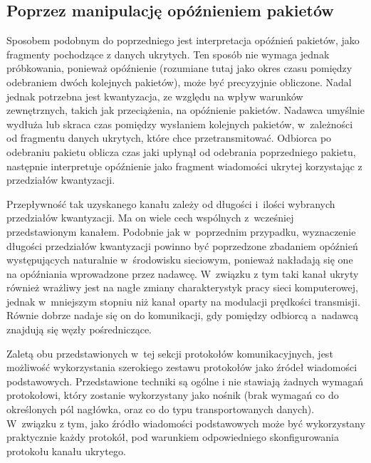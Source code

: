 \documentclass[a4paper, twoside, 12pt]{report}
\begin{document}
        \subsection{Poprzez manipulację opóźnieniem pakietów}
        Sposobem podobnym do poprzedniego jest interpretacja opóźnień pakietów,
        jako fragmenty pochodzące z danych ukrytych\cite{IPDELAYCHANNEL}. Ten sposób nie wymaga jednak próbkowania,
        ponieważ opóźnienie (rozumiane tutaj jako okres czasu pomiędzy odebraniem dwóch
        kolejnych pakietów), może być precyzyjnie obliczone. Nadal jednak potrzebna
        jest kwantyzacja, ze względu na wpływ warunków zewnętrznych, takich jak przeciążenia,
        na opóźnienie pakietów. Nadawca umyślnie wydłuża lub skraca czas pomiędzy
        wysłaniem kolejnych pakietów, w~zależności od fragmentu danych ukrytych,
        które chce przetransmitować. Odbiorca po odebraniu pakietu oblicza czas jaki
        upłynął od odebrania poprzedniego pakietu, następnie
        interpretuje opóźnienie jako fragment wiadomości ukrytej korzystając z
        przedziałów kwantyzacji.

        Przepływność tak uzyskanego kanału zależy od długości i~ilości wybranych
        przedziałów kwantyzacji. Ma on wiele cech wspólnych z~wcześniej przedstawionym
        kanałem. Podobnie jak w~poprzednim przypadku, wyznaczenie długości
        przedziałów kwantyzacji powinno być poprzedzone zbadaniem opóźnień występujących
        naturalnie w~środowisku sieciowym, ponieważ nakładają się one na opóźniania
        wprowadzone przez nadawcę. W~związku z tym taki kanał ukryty również wrażliwy jest
        na nagłe zmiany charakterystyk pracy sieci komputerowej, jednak w~mniejszym
        stopniu niż kanał oparty na modulacji prędkości transmisji. Równie dobrze
        nadaje się on do komunikacji, gdy pomiędzy odbiorcą a~nadawcą znajdują się
        węzły pośredniczące.

        Zaletą obu przedstawionych w~tej sekcji protokołów komunikacyjnych,
        jest możliwość wykorzystania szerokiego zestawu protokołów jako
        źródeł wiadomości podstawowych. Przedstawione techniki są ogólne i
        nie stawiają żadnych wymagań protokołowi, który zostanie wykorzystany jako
        nośnik (brak wymagań co do określonych pól nagłówka, oraz co do typu transportowanych danych).
        W~związku z tym, jako źródło wiadomości podstawowych może być wykorzystany
        praktycznie każdy protokół, pod warunkiem odpowiedniego skonfigurowania
        protokołu kanału ukrytego.
\end{document}
